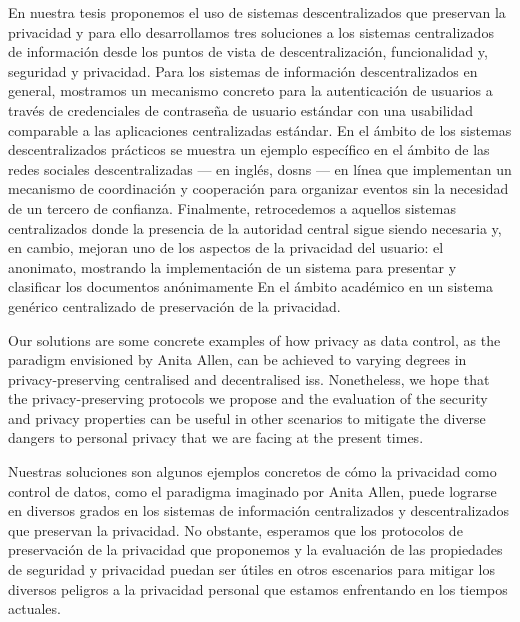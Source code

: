     En nuestra tesis proponemos el uso de sistemas descentralizados que preservan 
    la privacidad y para ello desarrollamos tres soluciones a los sistemas centralizados 
    de información desde los puntos de vista de descentralización, funcionalidad y,
    seguridad y privacidad. 
    Para los sistemas de información descentralizados en general, mostramos un mecanismo 
    concreto para la autenticación de usuarios a través de credenciales de contraseña 
    de usuario estándar con una usabilidad comparable a las aplicaciones centralizadas 
    estándar. En el ámbito de los sistemas descentralizados prácticos se muestra 
    un ejemplo específico en el ámbito de las redes sociales descentralizadas --- en inglés, \aclp*{dosn} --- en 
    línea que implementan un mecanismo de coordinación y cooperación para organizar 
    eventos sin la necesidad de un tercero de confianza. Finalmente, retrocedemos 
    a aquellos sistemas centralizados donde la presencia de la autoridad central 
    sigue siendo necesaria y, en cambio, mejoran uno de los aspectos de la privacidad 
    del usuario: el anonimato, mostrando la implementación de un sistema para presentar 
    y clasificar los documentos anónimamente En el ámbito académico en un sistema 
    genérico centralizado de preservación de la privacidad.
    
    Our solutions are some concrete examples of how privacy as data control, as 
    the paradigm envisioned by Anita Allen, can be achieved to varying degrees in 
    privacy-preserving centralised and decentralised \aclp*{is}. Nonetheless, we 
    hope that the privacy-preserving protocols we propose and the evaluation of 
    the security and privacy properties can be useful in other scenarios to mitigate 
    the diverse dangers to personal privacy that we are facing at the present times.
    
    Nuestras soluciones son algunos ejemplos concretos de cómo la privacidad como 
    control de datos, como el paradigma imaginado por Anita Allen, puede lograrse 
    en diversos grados en los sistemas de información centralizados y descentralizados 
    que preservan la privacidad. No obstante, esperamos que los protocolos de preservación 
    de la privacidad que proponemos y la evaluación de las propiedades de seguridad 
    y privacidad puedan ser útiles en otros escenarios para mitigar los 
    diversos peligros a la privacidad personal que estamos enfrentando en los tiempos 
    actuales.
    